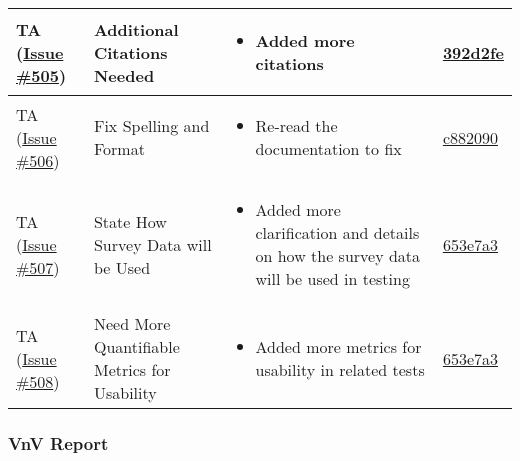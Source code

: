\documentclass{article}
\begin{document}
\begin{longtable}{|p{2cm}|p{3.5cm}|p{4.5cm}|p{3cm}|}
    TA (\href{https://github.com/ssm-lab/capstone--source-code-optimizer/issues/505}{Issue \#505}) & 
    Additional Citations Needed &
    \begin{itemize}[nosep,leftmargin=*]
        \item Added more citations
    \end{itemize} &
    \href{https://github.com/ssm-lab/capstone--source-code-optimizer/commit/392d2fed426d09ca5d226ed9bf5661db71c03b45}{392d2fe} \\
    \hline
    
    TA (\href{https://github.com/ssm-lab/capstone--source-code-optimizer/issues/506}{Issue \#506}) & 
    Fix Spelling and Format &
    \begin{itemize}[nosep,leftmargin=*]
        \item Re-read the documentation to fix
    \end{itemize} &
    \href{https://github.com/ssm-lab/capstone--source-code-optimizer/commit/c88209079443e8c2722190a65d204b4193b426e2}{c882090} \\
    \hline
    
    TA (\href{https://github.com/ssm-lab/capstone--source-code-optimizer/issues/507}{Issue \#507}) & 
    State How Survey Data will be Used &
    \begin{itemize}[nosep,leftmargin=*]
        \item Added more clarification and details on how the survey data will be used in testing
    \end{itemize} &
    \href{https://github.com/ssm-lab/capstone--source-code-optimizer/commit/653e7a3757dadfda6df3a3dce1aa7de512d62029}{653e7a3} \\
    \hline

    TA (\href{https://github.com/ssm-lab/capstone--source-code-optimizer/issues/508}{Issue \#508}) & 
    Need More Quantifiable Metrics for Usability &
    \begin{itemize}[nosep,leftmargin=*]
        \item Added more metrics for usability in related tests
    \end{itemize} &
    \href{https://github.com/ssm-lab/capstone--source-code-optimizer/commit/653e7a3757dadfda6df3a3dce1aa7de512d62029}{653e7a3} \\
    \hline
    
\end{longtable}

\subsubsection{VnV Report}
\end{document}

